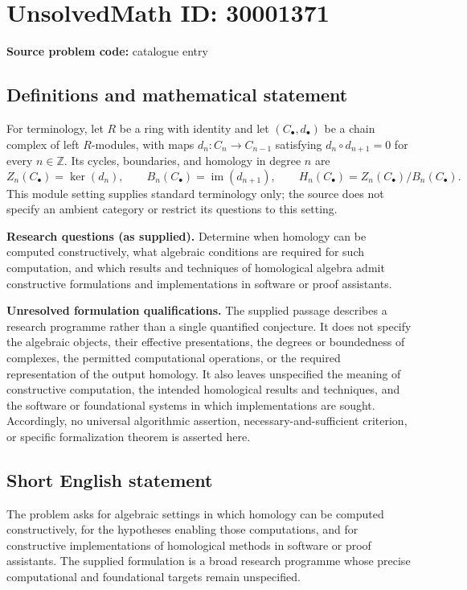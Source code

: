 \documentclass[11pt]{article}
\newcommand{\Z}{\mathbb{Z}}
\begin{document}
\section*{UnsolvedMath ID: 30001371}
\textbf{Source problem code:} catalogue entry
\subsection{Definitions and mathematical statement}
For terminology, let \(R\) be a ring with identity and let \((C_\bullet,d_\bullet)\) be a chain complex of left \(R\)-modules, with maps \(d_n:C_n\to C_{n-1}\) satisfying \(d_n\circ d_{n+1}=0\) for every \(n\in\Z\). Its cycles, boundaries, and homology in degree \(n\) are
\[
Z_n(C_\bullet)=\ker(d_n),\qquad B_n(C_\bullet)=\operatorname{im}(d_{n+1}),\qquad H_n(C_\bullet)=Z_n(C_\bullet)/B_n(C_\bullet).
\]
This module setting supplies standard terminology only; the source does not specify an ambient category or restrict its questions to this setting.

\textbf{Research questions (as supplied).} Determine when homology can be computed constructively, what algebraic conditions are required for such computation, and which results and techniques of homological algebra admit constructive formulations and implementations in software or proof assistants.

\textbf{Unresolved formulation qualifications.} The supplied passage describes a research programme rather than a single quantified conjecture. It does not specify the algebraic objects, their effective presentations, the degrees or boundedness of complexes, the permitted computational operations, or the required representation of the output homology. It also leaves unspecified the meaning of constructive computation, the intended homological results and techniques, and the software or foundational systems in which implementations are sought. Accordingly, no universal algorithmic assertion, necessary-and-sufficient criterion, or specific formalization theorem is asserted here.
\subsection{Short English statement}
The problem asks for algebraic settings in which homology can be computed constructively, for the hypotheses enabling those computations, and for constructive implementations of homological methods in software or proof assistants. The supplied formulation is a broad research programme whose precise computational and foundational targets remain unspecified.
\end{document}
